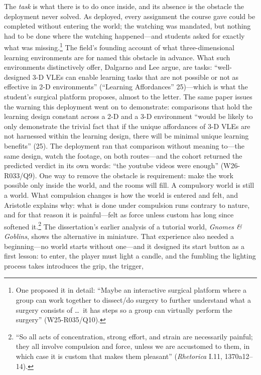 The \textit{task} is what there is to do once inside, and its absence
is the obstacle the deployment never solved. As deployed, every
assignment the course gave could be completed without entering the
world; the watching was mandated, but nothing had to be done where the
watching happened---and students asked for exactly what was
missing.\footnote{One proposed it in detail: ``Maybe an interactive
surgical platform where a group can work together to dissect/do
surgery to further understand what a surgery consists of \ldots\ it
has steps so a group can virtually perform the surgery''
(W25-R035/Q10).} The field's founding account of what
three-dimensional learning environments are for named this obstacle in
advance. What such environments distinctively offer, Dalgarno and Lee
argue, are tasks: ``well-designed 3-D VLEs can enable learning tasks
that are not possible or not as effective in 2-D environments''
(``Learning Affordances'' 25)---which is what the student's surgical
platform proposes, almost
to the letter. The same paper issues the warning this deployment went
on to demonstrate: comparisons that hold the learning design constant
across a 2-D and a 3-D environment ``would be likely to only
demonstrate the trivial fact that if the unique affordances of 3-D
VLEs are not harnessed within the learning design, there will be
minimal unique learning benefits'' (25). The deployment ran that
comparison without meaning to---the same design, watch the footage, on
both routes---and the cohort returned the predicted verdict in its own
words: ``the youtube videos were enough'' (W26-R033/Q9). One way to
remove the obstacle is requirement: make
the work possible only inside the world, and the rooms will fill. A
compulsory world is still a world. What compulsion changes is how the
world is entered and felt, and Aristotle explains why: what is done under
compulsion runs contrary to nature, and for that reason it is
painful---felt as force unless custom has long since softened
it.\footnote{``So all acts of concentration, strong effort, and strain
are necessarily painful; they all involve compulsion and force, unless
we are accustomed to them, in which case it is custom that makes them
pleasant'' (\textit{Rhetorica} I.11, 1370a12--14).} The dissertation's
earlier analysis of a tutorial world, \textit{Gnomes \& Goblins},
shows the alternative in miniature. That experience also needed a
beginning---no world starts without one---and it designed its start
button as a first lesson: to enter, the player must light a candle,
and the fumbling the lighting process takes introduces the grip, the trigger,
